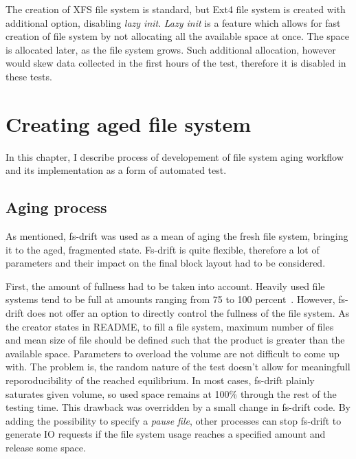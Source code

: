 \documentclass[
  color, %
  table, %
  lof,   %
  lot,   %
]{fithesis3}
\begin{document}
The creation of XFS file system is standard, but Ext4 file system is created with additional option, disabling \textit{lazy init}. \textit{Lazy init} is a feature which allows for fast creation of file system by not allocating all the available space at once. The space is allocated later, as the file system grows. Such additional allocation, however would skew data collected in the first hours of the test, therefore it is disabled in these tests.

\chapter{Creating aged file system}
In this chapter, I describe process of developement of file system aging workflow and its implementation as a form of automated test.

\section{Aging process}
As mentioned, fs-drift was used as a mean of aging the fresh file system, bringing it to the aged, fragmented state. Fs-drift is quite flexible, therefore a lot of parameters and their impact on the final block layout had to be considered.

First, the amount of fullness had to be taken into account. Heavily used file systems tend to be full at amounts ranging from 75 to 100 percent~\cite{agrawal2007five}. However, fs-drift does not offer an option to directly control the fullness of the file system. As the creator states in README, to fill a file system, maximum number of files and mean size of file should be defined such that the product is greater than the available space. Parameters to overload the volume are not difficult to come up with. The problem is, the random nature of the test doesn't allow for meaningfull reporoducibility of the reached equilibrium. In most cases, fs-drift plainly saturates given volume, so used space remains at 100\% through the rest of the testing time. This drawback was overridden by a small change in fs-drift code\footnotemark[1]. By adding the possibility to specify a \textit{pause file}, other processes can stop fs-drift to generate IO requests if the file system usage reaches a specified amount and release some space.


\end{document}
